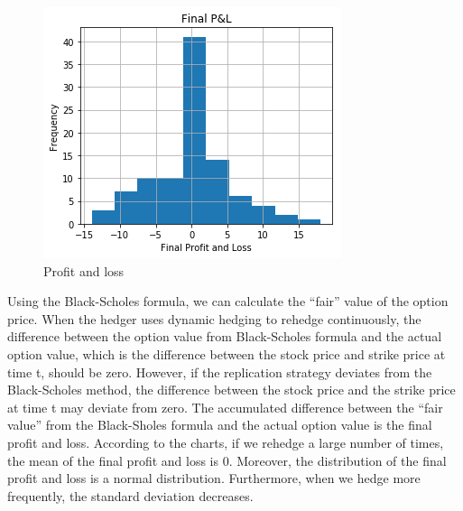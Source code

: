 \documentclass[fleqn,12pt]{SelfArx}
\def\mystyle{decsci}
\begin{document}
\begin{figure}[ht]\centering
	\includegraphics{PL}
	\caption{Profit and loss}
\end{figure}

Using the Black-Scholes formula, we can calculate the “fair” value of the option price. When the hedger uses dynamic hedging to rehedge continuously, the difference between the option value from Black-Scholes formula and the actual option value, which is the difference between the stock price and strike price at time t, should be zero. However, if the replication strategy deviates from the Black-Scholes method, the difference between the stock price and the strike price at time t may deviate from zero. The accumulated difference between the “fair value” from the Black-Sholes formula and the actual option value is the final profit and loss. According to the charts, if we rehedge a large number of times, the mean of the final profit and loss is 0. Moreover, the distribution of the final profit and loss is a normal distribution. Furthermore, when we hedge more frequently, the standard deviation decreases.

\end{document}
